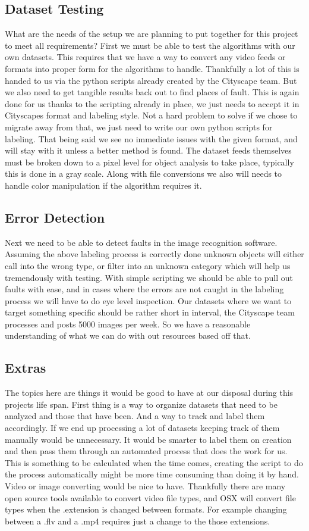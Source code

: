 \documentclass[10pt,draftclsnofoot,onecolumn,journal,compsoc]{IEEEtran}
\begin{document}
	\subsection{Dataset Testing}
	What are the needs of the setup we are planning to put together for this project to meet all requirements? First we must be able to test the algorithms with our own datasets. This requires that we have a way to convert any video feeds or formats into proper form for the algorithms to handle. Thankfully a lot of this is handed to us via the python scripts already created by the Cityscape team. But we also need to get tangible results back out to find places of fault. This is again done for us thanks to the scripting already in place, we just needs to accept it in Cityscapes format and labeling style. Not a hard problem to solve if we chose to migrate away from that, we just need to write our own python scripts for labeling. That being said we see no immediate issues with the given format, and will stay with it unless a better method is found. The dataset feeds themselves must be broken down to a pixel level for object analysis to take place, typically this is done in a gray scale. Along with file conversions we also will needs to handle color manipulation if the algorithm requires it.
	\subsection{Error Detection}
	Next we need to be able to detect faults in the image recognition software. Assuming the above labeling process is correctly done unknown objects will either call into the wrong type, or filter into an unknown category which will help us tremendously with testing. With simple scripting we should be able to pull out faults with ease, and in cases where the errors are not caught in the labeling process we will have to do eye level inspection. Our datasets where we want to target something specific should be rather short in interval, the Cityscape team processes and posts 5000 images per week. So we have a reasonable understanding of what we can do with out resources based off that.
	\subsection{Extras}
	The topics here are things it would be good to have at our disposal during this projects life span. First thing is a way to organize datasets that need to be analyzed and those that have been. And a way to track and label them accordingly. If we end up processing a lot of datasets keeping track of them manually would be unnecessary. It would be smarter to label them on creation and then pass them through an automated process that does the work for us. This is something to be calculated when the time comes, creating the script to do the process automatically might be more time consuming than doing it by hand. 
	Video or image converting would be nice to have. Thankfully there are many open source tools available to convert video file types, and OSX will convert file types when the .extension is changed between formats. For example changing between a .flv and a .mp4 requires just a change to the those extensions. 
	
\end{document}
